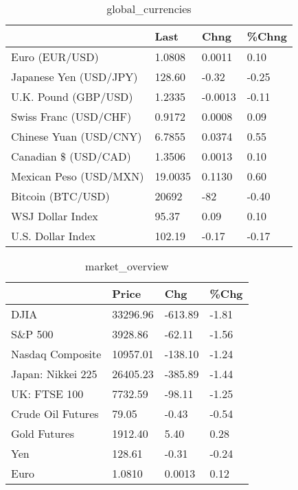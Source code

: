\documentclass{article}%
\begin{document}
%


\begin{table}[htbp]%
\caption{global\_currencies}%
\centering%
\begin{adjustbox}{width=1\textwidth}%
\begin{tabular}{llll}
\toprule
                       &    Last &    Chng & \%Chng \\
\midrule
        Euro (EUR/USD) &  1.0808 &  0.0011 &  0.10 \\
Japanese Yen (USD/JPY) &  128.60 &   -0.32 & -0.25 \\
  U.K. Pound (GBP/USD) &  1.2335 & -0.0013 & -0.11 \\
 Swiss Franc (USD/CHF) &  0.9172 &  0.0008 &  0.09 \\
Chinese Yuan (USD/CNY) &  6.7855 &  0.0374 &  0.55 \\
  Canadian \$ (USD/CAD) &  1.3506 &  0.0013 &  0.10 \\
Mexican Peso (USD/MXN) & 19.0035 &  0.1130 &  0.60 \\
     Bitcoin (BTC/USD) &   20692 &     -82 & -0.40 \\
      WSJ Dollar Index &   95.37 &    0.09 &  0.10 \\
     U.S. Dollar Index &  102.19 &   -0.17 & -0.17 \\
\bottomrule
\end{tabular}
%
\end{adjustbox}%
\end{table}

%


\begin{table}[htbp]%
\caption{market\_overview}%
\centering%
\begin{adjustbox}{width=1\textwidth}%
\begin{tabular}{llll}
\toprule
                  &    Price &     Chg &  \%Chg \\
\midrule
             DJIA & 33296.96 & -613.89 & -1.81 \\
          S\&P 500 &  3928.86 &  -62.11 & -1.56 \\
 Nasdaq Composite & 10957.01 & -138.10 & -1.24 \\
Japan: Nikkei 225 & 26405.23 & -385.89 & -1.44 \\
     UK: FTSE 100 &  7732.59 &  -98.11 & -1.25 \\
Crude Oil Futures &    79.05 &   -0.43 & -0.54 \\
     Gold Futures &  1912.40 &    5.40 &  0.28 \\
              Yen &   128.61 &   -0.31 & -0.24 \\
             Euro &   1.0810 &  0.0013 &  0.12 \\
\bottomrule
\end{tabular}
%
\end{adjustbox}%
\end{table}

%
\end{document}
